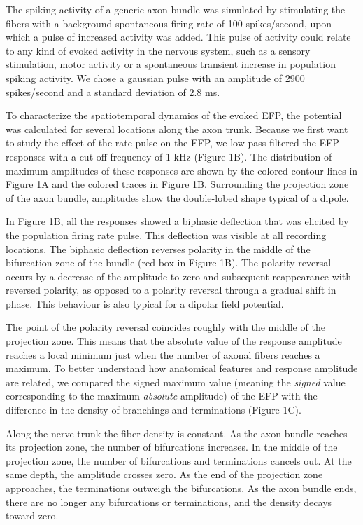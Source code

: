 \documentclass[]{article}
\begin{document}
The spiking activity of a generic axon bundle was simulated by
stimulating the fibers with a background spontaneous firing rate of 100
spikes/second, upon which a pulse of increased activity was added. This
pulse of activity could relate to any kind of evoked activity in the
nervous system, such as a sensory stimulation, motor activity or a
spontaneous transient increase in population spiking activity. We chose
a gaussian pulse with an amplitude of 2900 spikes/second and a standard
deviation of 2.8 ms.

To characterize the spatiotemporal dynamics of the evoked EFP, the
potential was calculated for several locations along the axon trunk.
Because we first want to study the effect of the rate pulse on the EFP,
we low-pass filtered the EFP responses with a cut-off frequency of 1 kHz
(Figure 1B). The distribution of maximum amplitudes of these responses
are shown by the colored contour lines in Figure 1A and the colored
traces in Figure 1B. Surrounding the projection zone of the axon bundle,
amplitudes show the double-lobed shape typical of a dipole.

In Figure 1B, all the responses showed a biphasic deflection that was
elicited by the population firing rate pulse. This deflection was
visible at all recording locations. The biphasic deflection reverses
polarity in the middle of the bifurcation zone of the bundle (red box in
Figure 1B). The polarity reversal occurs by a decrease of the amplitude
to zero and subsequent reappearance with reversed polarity, as opposed
to a polarity reversal through a gradual shift in phase. This behaviour
is also typical for a dipolar field potential.

The point of the polarity reversal coincides roughly with the middle of
the projection zone. This means that the absolute value of the response
amplitude reaches a local minimum just when the number of axonal fibers
reaches a maximum. To better understand how anatomical features and
response amplitude are related, we compared the signed maximum value
(meaning the \emph{signed} value corresponding to the maximum
\emph{absolute} amplitude) of the EFP with the difference in the density
of branchings and terminations (Figure 1C).

Along the nerve trunk the fiber density is constant. As the axon bundle
reaches its projection zone, the number of bifurcations increases. In
the middle of the projection zone, the number of bifurcations and
terminations cancels out. At the same depth, the amplitude crosses zero.
As the end of the projection zone approaches, the terminations outweigh
the bifurcations. As the axon bundle ends, there are no longer any
bifurcations or terminations, and the density decays toward zero.
\end{document}
